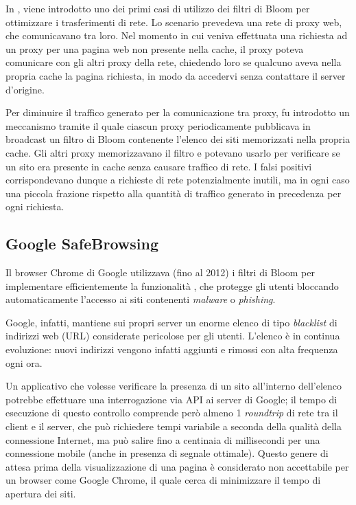 In \cite{bloom-proxy}, viene introdotto uno dei primi casi di utilizzo dei filtri di Bloom per
ottimizzare i trasferimenti di rete. Lo scenario prevedeva una rete di proxy web, che comunicavano
tra loro. Nel momento in cui veniva effettuata una richiesta ad un proxy per una pagina web non
presente nella cache, il proxy poteva comunicare con gli altri proxy della rete, chiedendo loro
se qualcuno aveva nella propria cache la pagina richiesta, in modo da accedervi senza contattare
il server d'origine.

Per diminuire il traffico generato per la comunicazione tra proxy, fu introdotto un meccanismo
tramite il quale ciascun proxy periodicamente pubblicava in broadcast un filtro di Bloom contenente
l'elenco dei siti memorizzati nella propria cache. Gli altri proxy memorizzavano il filtro e
potevano usarlo per verificare se un sito era presente in cache senza causare traffico di rete. I
falsi positivi corrispondevano dunque a richieste di rete potenzialmente inutili, ma in ogni caso
una piccola frazione rispetto alla quantità di traffico generato in precedenza per ogni richiesta.


\subsection{Google SafeBrowsing}

Il browser Chrome di Google utilizzava (fino al 2012) i filtri di Bloom per implementare
efficientemente la funzionalità , che
protegge gli utenti bloccando automaticamente l'accesso ai siti contenenti \emph{malware} o
\emph{phishing}.

Google, infatti, mantiene sui propri server un enorme elenco di tipo \emph{blacklist} di indirizzi
web (URL) considerate pericolose per gli utenti. L'elenco è in continua evoluzione: nuovi indirizzi
vengono infatti aggiunti e rimossi con alta frequenza ogni ora.

Un applicativo che volesse verificare la presenza di un sito all'interno dell'elenco potrebbe
effettuare una interrogazione via API ai server di Google; il tempo di esecuzione di questo
controllo comprende però almeno 1 \emph{roundtrip} di rete tra il client e il server, che può
richiedere tempi variabile a seconda della qualità della connessione Internet, ma può salire fino a
centinaia di millisecondi per una connessione mobile (anche in presenza di segnale ottimale). Questo
genere di attesa prima della visualizzazione di una pagina è considerato non accettabile per un
browser come Google Chrome, il quale cerca di minimizzare il tempo di apertura dei siti.

